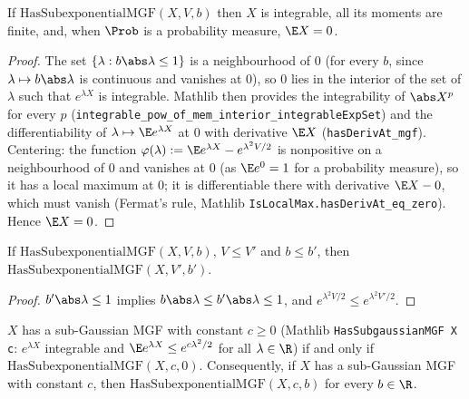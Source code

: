 \begin{lemma}\label{lem:ps_subexp_integral_zero}
\leanok
{}
If $\mathrm{HasSubexponentialMGF}(X,V,b)$ then $X$ is integrable, all its moments are finite,
and, when $\Prob$ is a probability measure, $\E X = 0$.
\end{lemma}

\begin{proof}
\leanok
{}
The set $\{\lambda : b\abs\lambda \le 1\}$ is a neighbourhood of $0$ (for every $b$, since
$\lambda \mapsto b\abs\lambda$ is continuous and vanishes at $0$), so $0$ lies in the interior
of the set of $\lambda$ such that $e^{\lambda X}$ is integrable. Mathlib then provides the
integrability of $\abs X^p$ for every $p$
(\texttt{integrable\_pow\_of\_mem\_interior\_integrableExpSet}) and the differentiability of
$\lambda \mapsto \E e^{\lambda X}$ at $0$ with derivative $\E X$ (\texttt{hasDerivAt\_mgf}).
Centering: the function $\varphi(\lambda) := \E e^{\lambda X} - e^{\lambda^2V/2}$ is
nonpositive on a neighbourhood of $0$ and vanishes at $0$ (as $\E e^{0} = 1$ for a probability
measure), so it has a local maximum at $0$; it is differentiable there with derivative
$\E X - 0$, which must vanish (Fermat's rule, Mathlib \texttt{IsLocalMax.hasDerivAt\_eq\_zero}).
Hence $\E X = 0$.
\end{proof}

\begin{lemma}\label{lem:ps_subexp_mono}
\leanok
{}
If $\mathrm{HasSubexponentialMGF}(X,V,b)$, $V \le V'$ and $b \le b'$, then
$\mathrm{HasSubexponentialMGF}(X,V',b')$.
\end{lemma}

\begin{proof}
\leanok
{}
$b'\abs\lambda \le 1$ implies $b\abs\lambda \le b'\abs\lambda \le 1$, and
$e^{\lambda^2V/2} \le e^{\lambda^2V'/2}$.
\end{proof}

\begin{lemma}[Sub-Gaussian is sub-exponential with $b = 0$]\label{lem:subexp_of_subgaussian}
\leanok
{}
$X$ has a sub-Gaussian MGF with constant $c \ge 0$ (Mathlib
\texttt{HasSubgaussianMGF X c}: $e^{\lambda X}$ integrable and $\E e^{\lambda X} \le e^{c\lambda^2/2}$
for all $\lambda\in\R$) if and only if $\mathrm{HasSubexponentialMGF}(X, c, 0)$. Consequently,
if $X$ has a sub-Gaussian MGF with constant $c$, then $\mathrm{HasSubexponentialMGF}(X, c, b)$
for every $b \in \R$.
\end{lemma}

